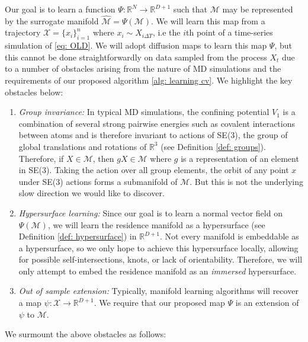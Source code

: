 \documentclass[reqno, 12pt]{article}
\begin{document}
Our goal is to learn a function $\Psi: \mathbb{R}^{N} \to \mathbb{R}^{D+1}$ such that $\mathcal{M}$ may be represented by the surrogate manifold $\widehat{\mathcal{M}} = \Psi(\mathcal{M})$. We will learn this map from a trajectory $\mathcal{X} = \{x_i\}_{i=1}^{n}$ where $x_i \sim X_{i\Delta T}$, i.e the $i$th point of a time-series simulation of \eqref{eq: OLD}. We will adopt diffusion maps \parencite{coifman2008diffusion} to learn this map $\Psi$, but this cannot be done straightforwardly on data sampled from the process $X_t$ due to a number of obstacles arising from the nature of MD simulations and the requirements of our proposed algorithm \eqref{alg: learning cv}. We highlight the key  obstacles below:
\begin{enumerate}
    \item \emph{Group invariance:} In typical MD simulations, the confining potential $V_{1}$ is a combination of several strong pairwise energies such as covalent interactions between atoms and is therefore invariant to actions of SE(3), the group of global translations and rotations of $\mathbb{R}^3$ (see Definition \eqref{def: groups}). Therefore, if $X \in \mathcal{M}$, then $gX \in \mathcal{M}$ where $g$ is a representation of an element in SE(3). Taking the action over all group elements, the orbit of any point $x$ under SE(3) actions forms a submanifold of $\mathcal{M}$. But this is not the underlying slow direction we would like to discover. 
    \item \emph{Hypersurface learning:} Since our goal is to learn a normal vector field on $\Psi(\mathcal{M})$, we will learn the residence manifold as a hypersurface (see Definition \eqref{def: hypersurface}) in $\mathbb{R}^{D+1}$. Not every manifold is embeddable as a hypersurface, so we only hope to achieve this hypersurface locally, allowing for possible self-intersections, knots, or lack of orientability. Therefore, we will only attempt to embed the residence manifold as an \emph{immersed} hypersurface.  
    \item \emph{Out of sample extension:} Typically, manifold learning algorithms will recover a map $\psi: \mathcal{X} \to \mathbb{R}^{D+1}$. We require that our proposed map $\Psi$ is an extension of $\psi$ to $\mathcal{M}$. 
\end{enumerate} 
We surmount the above obstacles as follows:
\end{document}
